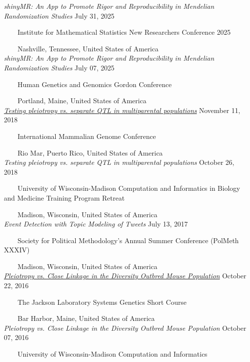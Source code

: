 \documentclass[
  10pt,
]
{article}
\begin{document}
\normalsize \textit{shinyMR: An App to Promote Rigor and Reproducibility in Mendelian Randomization Studies}
\hfill July 31, 2025\\
\strut ~~~~Institute for Mathematical Statistics New Researchers
Conference 2025\\
\strut ~~~~Nashville, Tennessee, United States of America\\
\normalsize \textit{shinyMR: An App to Promote Rigor and Reproducibility in Mendelian Randomization Studies}
\hfill July 07, 2025\\
\strut ~~~~Human Genetics and Genomics Gordon Conference\\
\strut ~~~~Portland, Maine, United States of America\\
\normalsize \href{https://github.com/fboehm/imgc2018poster}{\textit{Testing pleiotropy vs. separate QTL in multiparental populations}}
\hfill November 11, 2018\\
\strut ~~~~International Mammalian Genome Conference\\
\strut ~~~~Rio Mar, Puerto Rico, United States of America\\
\normalsize \textit{Testing pleiotropy vs. separate QTL in multiparental populations}
\hfill October 26, 2018\\
\strut ~~~~University of Wisconsin-Madison Computation and Informatics
in Biology and Medicine Training Program Retreat\\
\strut ~~~~Madison, Wisconsin, United States of America\\
\normalsize \textit{Event Detection with Topic Modeling of Tweets}
\hfill July 13, 2017\\
\strut ~~~~Society for Political Methodology's Annual Summer Conference
(PolMeth XXXIV)\\
\strut ~~~~Madison, Wisconsin, United States of America\\
\normalsize \href{https://figshare.com/articles/Pleiotropy_vs_Close_Linkage_in_the_Diversity_Outbred_Mouse_Population/4284338}{\textit{Pleiotropy vs. Close Linkage in the Diversity Outbred Mouse Population}}
\hfill October 22, 2016\\
\strut ~~~~The Jackson Laboratory Systems Genetics Short Course\\
\strut ~~~~Bar Harbor, Maine, United States of America\\
\normalsize \textit{Pleiotropy vs. Close Linkage in the Diversity Outbred Mouse Population}
\hfill October 07, 2016\\
\strut ~~~~University of Wisconsin-Madison Computation and Informatics
\end{document}
